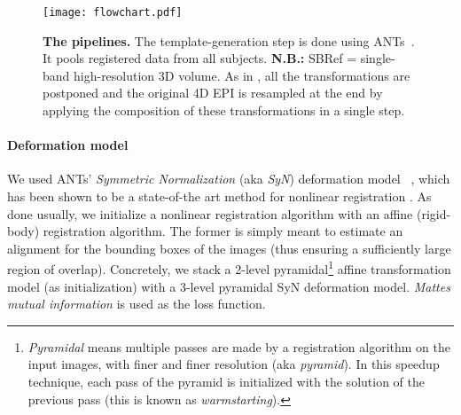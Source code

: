 \begin{figure}[!htpb]
     \texttt{[image: flowchart.pdf]}
\caption{\textbf{The pipelines.} The template-generation step is done using ANTs~\citep{avants2008,avants2011}. It pools registered data from all subjects. \textbf{N.B.:} SBRef = single-band high-resolution 3D volume. As in \citep{glasser2013}, all the transformations are postponed and the original 4D EPI is resampled at the end by applying the composition of these transformations in a single step.}
\label{fig:pipelines}
\end{figure}

\paragraph{Deformation model}
We used ANTs' \textit{Symmetric Normalization} (aka \textit{SyN})
deformation model ~\citep{avants2008,avants2011}, which has been shown
to be a state-of-the art method for nonlinear registration
\citep{pmid19195496}. As done usually, we initialize a nonlinear
registration algorithm with an affine (rigid-body) registration
algorithm.
%
The former is simply meant to estimate an alignment for the
bounding boxes of the images (thus ensuring a sufficiently large
region of overlap). Concretely, we stack a 2-level
pyramidal\footnote{\textit{Pyramidal} means multiple passes are
made by a registration algorithm on the input images, with finer
and finer resolution (aka \textit{pyramid}). In this speedup technique, each
pass of the pyramid is initialized with the solution of the
previous pass (this is known as \textit{warmstarting}).}  affine
transformation model (as initialization) with a 3-level pyramidal
SyN deformation model. \textit{Mattes mutual information}
\citep{mattes2003} is used as the loss function.


